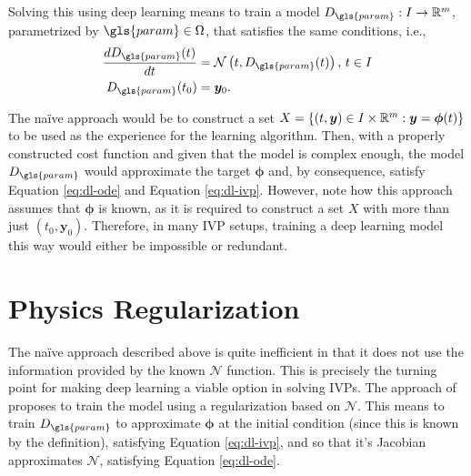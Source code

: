Solving this using deep learning means to train a model $D_{\gls{param}}:I\to \R^{m}$, parametrized by $\gls{param}\in \Omega$, that satisfies the same conditions, i.e.,
\begin{align}
    \frac{d D_{\gls{param}}(t)}{d t} &= \mathcal{N}\left( t, D_{\gls{param}}(t) \right),\,t\in I \label{eq:dl-ode} \\
    D_{\gls{param}}(t_0) &= \bm{y}_0 \label{eq:dl-ivp}
.\end{align}

The naïve approach would be to construct a set $X=\left\{ (t,\bm{y})\in I\times \mathbb{R}^{m}: \bm{y}=\bm{\phi}(t) \right\} $ to be used as the experience for the learning algorithm.
Then, with a properly constructed cost function and given that the model is complex enough, the model $D_{\gls{param}}$ would approximate the target $\bm{\phi}$ and, by consequence, satisfy Equation \eqref{eq:dl-ode} and Equation \eqref{eq:dl-ivp}.
However, note how this approach assumes that $\bm{\phi}$ is known, as it is required to construct a set $X$ with more than just $\left( t_0,\bm{y}_0 \right) $.
Therefore, in many \gls{IVP} setups, training a deep learning model this way would either be impossible or redundant.

\section{Physics Regularization}\label{sec:PI}

The naïve approach described above is quite inefficient in that it does not use the information provided by the known $\mathcal{N}$ function.
This is precisely the turning point for making deep learning a viable option in solving \gls{IVP}s.
The approach of \textcite{Raissi2019} proposes to train the model using a regularization based on $\mathcal{N}$.
This means to train $D_{\gls{param}}$ to approximate $\bm{\phi}$ at the initial condition (since this is known by the definition), satisfying Equation \eqref{eq:dl-ivp}, and so that it's Jacobian approximates $\mathcal{N}$, satisfying Equation \eqref{eq:dl-ode}.


